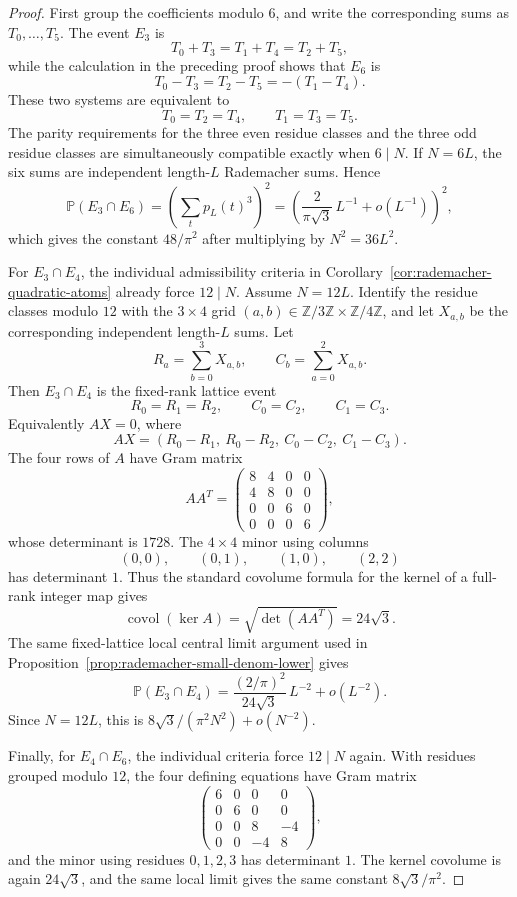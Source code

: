 \documentclass[11pt]{amsart}
\numberwithin{equation}{section}
\theoremstyle{definition}
\theoremstyle{remark}
\newcommand{\Prob}{\mathbb P}
\begin{document}
\begin{proof}
First group the coefficients modulo \(6\), and write the corresponding sums as
\(T_0,\ldots,T_5\).  The event \(E_3\) is
\[
  T_0+T_3=T_1+T_4=T_2+T_5,
\]
while the calculation in the preceding proof shows that \(E_6\) is
\[
  T_0-T_3=T_2-T_5=-(T_1-T_4).
\]
These two systems are equivalent to
\[
  T_0=T_2=T_4,\qquad T_1=T_3=T_5.
\]
The parity requirements for the three even residue classes and the three odd
residue classes are simultaneously compatible exactly when \(6\mid N\).  If
\(N=6L\), the six sums are independent length-\(L\) Rademacher sums.  Hence
\[
  \Prob(E_3\cap E_6)=\left(\sum_t p_L(t)^3\right)^2
  =\left(\frac{2}{\pi\sqrt3}\,L^{-1}+o(L^{-1})\right)^2,
\]
which gives the constant \(48/\pi^2\) after multiplying by \(N^2=36L^2\).

For \(E_3\cap E_4\), the individual admissibility criteria in
Corollary~\ref{cor:rademacher-quadratic-atoms} already force \(12\mid N\).
Assume \(N=12L\).  Identify the residue classes modulo \(12\) with the
\(3\times4\) grid \((a,b)\in\mathbb Z/3\mathbb Z\times\mathbb Z/4\mathbb Z\),
and let \(X_{a,b}\) be the corresponding independent length-\(L\) sums.  Let
\[
  R_a=\sum_{b=0}^3X_{a,b},\qquad
  C_b=\sum_{a=0}^2X_{a,b}.
\]
Then \(E_3\cap E_4\) is the fixed-rank lattice event
\[
  R_0=R_1=R_2,\qquad C_0=C_2,\qquad C_1=C_3 .
\]
Equivalently \(AX=0\), where
\[
  AX=(R_0-R_1,\ R_0-R_2,\ C_0-C_2,\ C_1-C_3).
\]
The four rows of \(A\) have Gram matrix
\[
  AA^T=
  \begin{pmatrix}
    8&4&0&0\\
    4&8&0&0\\
    0&0&6&0\\
    0&0&0&6
  \end{pmatrix},
\]
whose determinant is \(1728\).  The \(4\times4\) minor using columns
\[
  (0,0),\qquad (0,1),\qquad (1,0),\qquad (2,2)
\]
has determinant \(1\).  Thus the standard covolume formula for the kernel of a
full-rank integer map gives
\[
  \operatorname{covol}(\ker A)=\sqrt{\det(AA^T)}=24\sqrt3 .
\]
The same fixed-lattice local central limit argument used in
Proposition~\ref{prop:rademacher-small-denom-lower} gives
\[
  \Prob(E_3\cap E_4)
  =\frac{(2/\pi)^2}{24\sqrt3}\,L^{-2}+o(L^{-2}).
\]
Since \(N=12L\), this is \(8\sqrt3/(\pi^2N^2)+o(N^{-2})\).

Finally, for \(E_4\cap E_6\), the individual criteria force \(12\mid N\) again.
With residues grouped modulo \(12\), the four defining equations have Gram
matrix
\[
  \begin{pmatrix}
    6&0&0&0\\
    0&6&0&0\\
    0&0&8&-4\\
    0&0&-4&8
  \end{pmatrix},
\]
and the minor using residues \(0,1,2,3\) has determinant \(1\).  The kernel
covolume is again \(24\sqrt3\), and the same local limit gives the same
constant \(8\sqrt3/\pi^2\).
\end{proof}
\end{document}
